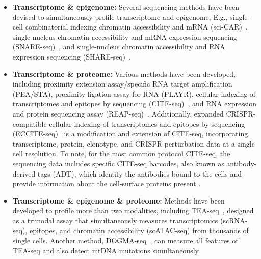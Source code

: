 \begin{itemize}
	\item \textbf{Transcriptome \& epigenome:}
	Several sequencing methods have been devised to simultaneously profile transcriptome and epigenome, E.g., single-cell combinatorial indexing chromatin accessibility and mRNA (sci-CAR)~\citep{cao2018scicar}, single-nucleus chromatin accessibility and mRNA expression sequencing (SNARE-seq)~\citep{chen2019SNARE}, and single-nucleus chromatin accessibility and RNA expression sequencing (SHARE-seq)~\citep{ma2020shareseq}.


	\item \textbf{Transcriptome \& proteome:}
	Various methods have been developed, including proximity extension assay/specific RNA target amplification (PEA/STA), proximity ligation assay for RNA (PLAYR), cellular indexing of transcriptomes and epitopes by sequencing (CITE-seq)~\citep{stoeckius2017citeseq}, and RNA expression and protein sequencing assay (REAP-seq)~\citep{peterson2017reapseq}. Additionally, expanded CRISPR-compatible cellular indexing of transcriptomes and epitopes by sequencing (ECCITE-seq)~\citep{mimitou2019ECCITE} is a modification and extension of CITE-seq, incorporating transcriptome, protein, clonotype, and CRISPR perturbation data at a single-cell resolution. To note, for the most common protocol CITE-seq, the sequencing data includes specific CITE-seq barcodes, also known as antibody-derived tags (ADT), which identify the antibodies bound to the cells and provide information about the cell-surface proteins present \citep{stoeckius2017citeseq}.

	\item \textbf{Transcriptome \& epigenome \& proteome:}
	Methods have been developed to profile more than two modalities, including TEA-seq~\citep{swanson2021simultaneous}, designed as a trimodal assay that simultaneously measures transcriptomics (scRNA-seq), epitopes, and chromatin accessibility (scATAC-seq) from thousands of single cells. Another method, DOGMA-seq~\citep{mimitou2021scalable}, can measure all features of TEA-seq and also detect mtDNA mutations simultaneously.

\end{itemize}

